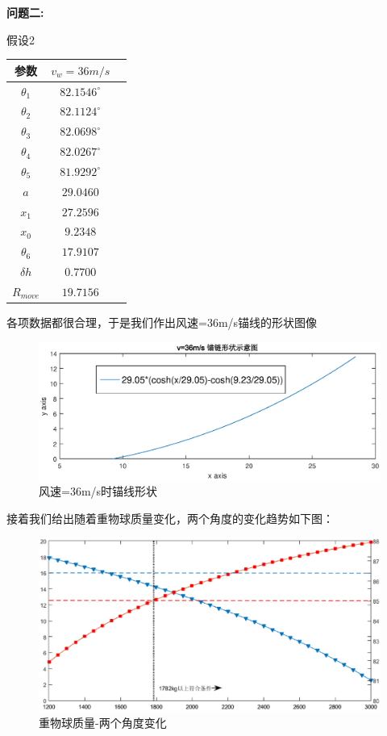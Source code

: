 \documentclass[a4paper,12pt]{ctexart}
\begin{document}
\noindent \textbf{问题二:}

假设2\\
\begin{center}
\begin{tabular}{ccc}
\hline \hline
\multicolumn{1}{c}{参数}&\multicolumn{1}{c}{$v_w=36m/s$}\\
\hline
$\theta_1$ & $82.1546^{\circ}$\\
$\theta_2$ & $82.1124^{\circ}$\\
$\theta_3$ & $82.0698^{\circ}$\\
$\theta_4$ & $82.0267^{\circ}$\\
$\theta_5$ & $81.9292^{\circ}$\\
$a$ & $29.0460 $ \\
$x_1$&$27.2596$ \\
$x_0$&$9.2348$ \\
$\theta_6$ & $17.9107$  \\
$\delta h$&$0.7700$\\
$R_{move}$&$19.7156$ \\
\hline \hline
\end{tabular}
\end{center}

各项数据都很合理，于是我们作出风速=36m/s锚线的形状图像\\

\begin{figure}[H]
\centering
\includegraphics[width=380pt]{V36ms.eps}
\caption{风速=36m/s时锚线形状}
\end{figure}

接着我们给出随着重物球质量变化，两个角度的变化趋势如下图：\\

\begin{figure}[H]
\centering
\includegraphics[width = 380pt]{question2.eps}
\caption{重物球质量-两个角度变化}
\end{figure}
\end{document}
